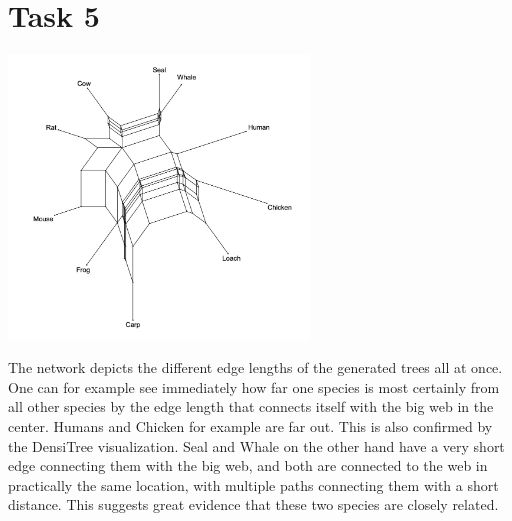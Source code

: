 \documentclass[10pt,a4paper]{article}
\begin{document}
	\section*{Task 5}
		\begin{center}\includegraphics[width = 0.6\textwidth]{tree5.png}\end{center}
		The network depicts the different edge lengths of the generated trees all at once. One can for example see immediately how far one species is most certainly from all other species by the edge length that connects itself with the big web in the center. Humans and Chicken for example are far out. This is also confirmed by the DensiTree visualization. Seal and Whale on the other hand have a very short edge connecting them with the big web, and both are connected to the web in practically the same location, with multiple paths connecting them with a short distance. This suggests great evidence that these two species are closely related. 
\end{document}
